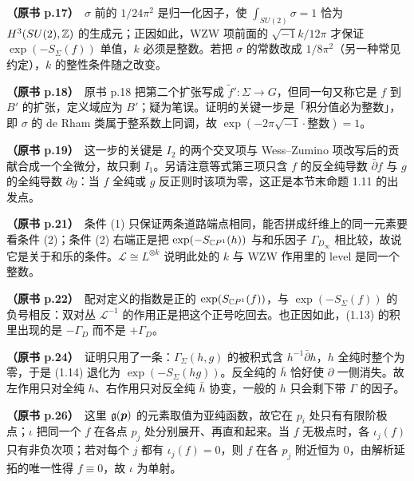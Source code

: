 \noindent \textbf{（原书 p.17）}\ $\sigma$ 前的 $1/24\pi^2$ 是归一化因子，使 $\int_{SU(2)}\sigma=1$ 恰为 $H^3(SU(2),\mathbb{Z})$ 的生成元；正因如此，WZW 项前面的 $\sqrt{-1}k/12\pi$ 才保证 $\exp(-S_\Sigma(f))$ 单值，$k$ 必须是整数。若把 $\sigma$ 的常数改成 $1/8\pi^2$（另一种常见约定），$k$ 的整性条件随之改变。\par\smallskip

\noindent \textbf{（原书 p.18）}\ 原书 p.18 把第二个扩张写成 $\tilde f':\Sigma\to G$，但同一句又称它是 $f$ 到 $B'$ 的扩张，定义域应为 $B'$；疑为笔误。证明的关键一步是「积分值必为整数」，即 $\sigma$ 的 de Rham 类属于整系数上同调，故 $\exp(-2\pi\sqrt{-1}\cdot\text{整数})=1$。\par\smallskip

\noindent \textbf{（原书 p.19）}\ 这一步的关键是 $I_2$ 的两个交叉项与 Wess--Zumino 项改写后的贡献合成一个全微分，故只剩 $I_1$。另请注意等式第三项只含 $f$ 的反全纯导数 $\bar\partial f$ 与 $g$ 的全纯导数 $\partial g$：当 $f$ 全纯或 $g$ 反正则时该项为零，这正是本节末命题 1.11 的出发点。\par\smallskip

\noindent \textbf{（原书 p.21）}\ 条件 (1) 只保证两条道路端点相同，能否拼成纤维上的同一元素要看条件 (2)；条件 (2) 右端正是把 $\exp(-S_{\mathbb{C}P^1}(h))$ 与和乐因子 $\Gamma_{D_\infty}$ 相比较，故说它是关于和乐的条件。$\mathcal{L}\cong L^{\otimes k}$ 说明此处的 $k$ 与 WZW 作用里的 level 是同一个整数。\par\smallskip

\noindent \textbf{（原书 p.22）}\ 配对定义的指数是正的 $\exp(S_{\mathbb{C}P^1}(f))$，与 $\exp(-S_\Sigma(f))$ 的负号相反：双对丛 $\mathcal{L}^{-1}$ 的作用正是把这个正号吃回去。也正因如此，(1.13) 的积里出现的是 $-\Gamma_D$ 而不是 $+\Gamma_D$。\par\smallskip

\noindent \textbf{（原书 p.24）}\ 证明只用了一条：$\Gamma_\Sigma(h,g)$ 的被积式含 $h^{-1}\bar\partial h$，$h$ 全纯时整个为零，于是 (1.14) 退化为 $\exp(-S_\Sigma(hg))$。反全纯的 $\bar h$ 恰好使 $\partial$ 一侧消失。故左作用只对全纯 $h$、右作用只对反全纯 $\bar h$ 协变，一般的 $h$ 只会剩下带 $\Gamma$ 的因子。\par\smallskip

\noindent \textbf{（原书 p.26）}\ 这里 $\mathfrak{g}(\bm p)$ 的元素取值为亚纯函数，故它在 $p_i$ 处只有有限阶极点；$\iota$ 把同一个 $f$ 在各点 $p_j$ 处分别展开、再直和起来。当 $f$ 无极点时，各 $\iota_j(f)$ 只有非负次项；若对每个 $j$ 都有 $\iota_j(f)=0$，则 $f$ 在各 $p_j$ 附近恒为 $0$，由解析延拓的唯一性得 $f\equiv0$，故 $\iota$ 为单射。\par\smallskip

